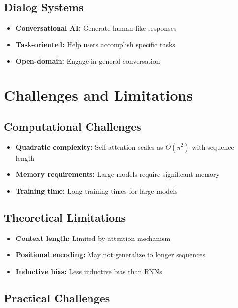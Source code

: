 \subsection{Dialog Systems}

\begin{itemize}
    \item \textbf{Conversational AI:} Generate human-like responses
    \item \textbf{Task-oriented:} Help users accomplish specific tasks
    \item \textbf{Open-domain:} Engage in general conversation
\end{itemize}

\section{Challenges and Limitations}

\subsection{Computational Challenges}

\begin{itemize}
    \item \textbf{Quadratic complexity:} Self-attention scales as $O(n^2)$ with sequence length
    \item \textbf{Memory requirements:} Large models require significant memory
    \item \textbf{Training time:} Long training times for large models
\end{itemize}

\subsection{Theoretical Limitations}

\begin{itemize}
    \item \textbf{Context length:} Limited by attention mechanism
    \item \textbf{Positional encoding:} May not generalize to longer sequences
    \item \textbf{Inductive bias:} Less inductive bias than RNNs
\end{itemize}

\subsection{Practical Challenges}

